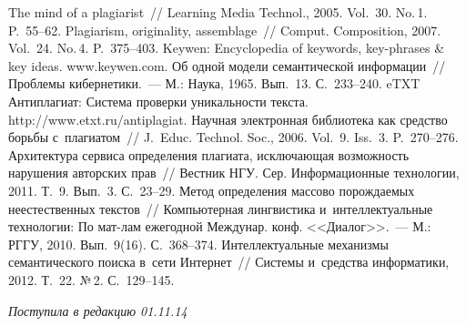 \begin{multicols}{2}
{{\begin{thebibliography}{99}
 The mind of a plagiarist~// Learning Media Technol.,
2005. Vol.~30. No.\,1. P.~55--62.
 Plagiarism, originality, assemblage~//
Comput. Composition, 2007. Vol.~24. No.\,4. P.~375--403.
Keywen: Encyclopedia of keywords, key-phrases \& key ideas. {\sf  www.keywen.com}.
 Об одной модели семантической информации~// Проблемы
кибернетики.~---  М.: Наука, 1965. Вып.~13. С.~233--240.
eTXT Антиплагиат: Система проверки уникальности текста. {\sf http://www.etxt.ru/antiplagiat}.
 Научная электронная библиотека как средство борьбы с~плагиатом~//
J.~Educ. Technol.  Soc., 2006. Vol.~9. Iss.~3. P.~270--276.
 Архитектура сервиса определения
плагиата, исключающая возможность нарушения авторских прав~// Вестник НГУ. Сер.
Информационные технологии, 2011. Т.~9. Вып.~3. С.~23--29.
 Метод определения массово порождаемых
неестественных текстов~// Компьютерная лингвистика и~интеллектуальные технологии:
По мат-лам ежегодной Междунар. конф. <<Диалог>>.~--- М.:
РГГУ, 2010. Вып.~9(16). С.~368--374.
 Интеллектуальные механизмы
семантического поиска в~сети Интернет~// Системы и~средства информатики, 2012.
Т.~22. №\,2. С.~129--145.
 \end{thebibliography}

 }
 }

\end{multicols}

\vspace*{-9pt}

\hfill{\small\textit{Поступила в редакцию 01.11.14}}

\newpage






\def\tit{FALSE TEXTS: CLASSIFICATION AND~METHODS OF~IDENTIFICATION
OF~TEXT DOCUMENTS WITH~IMITATIONS~AND~SUBSTITUTION OF~AUTHORSHIP\\[-4pt]}

\def\titkol{False texts: Classification and methods of identification of text documents with
imitations  and substitution of authorship}

